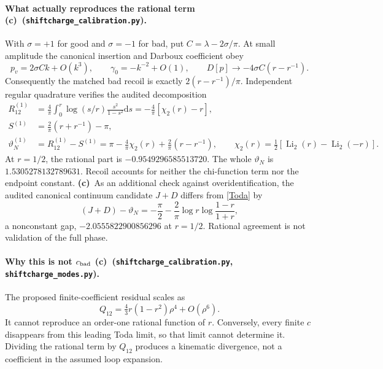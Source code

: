 \documentclass[11pt,a4paper]{article}
\newcommand{\C}{\textbf{(c)}\ }
\newcommand{\dd}{\mathrm d}
\newcommand{\file}[1]{\nolinkurl{#1}}
\newcommand{\modes}{\file{shiftcharge_modes.py}}
\newcommand{\calcheck}{\file{shiftcharge_calibration.py}}
\begin{document}
\paragraph{What actually reproduces the rational term \C (\calcheck).}
With $\sigma=+1$ for good and $\sigma=-1$ for bad, put
$C=\lambda-2\sigma/\pi$. At small amplitude the canonical insertion and
Darboux coefficient obey
\begin{equation}
 p_v=2\sigma Ck+O(k^3),\qquad \gamma_0=-k^{-2}+O(1),\qquad
 D[p]\longrightarrow-4\sigma C(r-r^{-1}).\label{Dlimit}
\end{equation}
Consequently the matched bad recoil is exactly $2(r-r^{-1})/\pi$.
Independent regular quadrature verifies the audited decomposition
\begin{align}
 R_{12}^{(1)}&=\frac4\pi\int_0^r\log(s/r)\frac{s^2}{1-s^2}\dd s
             =-\frac4\pi[\chi_2(r)-r],\\
 S^{(1)}&=\frac2\pi(r+r^{-1})-\pi,\\
 \vartheta_N^{(1)}&=R_{12}^{(1)}-S^{(1)}
       =\pi-\frac4\pi\chi_2(r)+\frac2\pi(r-r^{-1}),\qquad
 \chi_2(r)=\tfrac12[\operatorname{Li}_2(r)-\operatorname{Li}_2(-r)].
 \label{Toda}
\end{align}
At $r=1/2$, the rational part is $-0.9549296585513720$.
The whole $\vartheta_N$ is $1.5305278132789631$. Recoil accounts for neither
the chi-function term nor the endpoint constant.
\C As an additional check against overidentification, the audited canonical
continuum candidate $J+D$ differs from \eqref{Toda} by
\begin{equation}
 (J+D)-\vartheta_N=-\frac\pi2-\frac2\pi\log r\log\frac{1-r}{1+r},
\end{equation}
a nonconstant gap, $-2.0555822900856296$ at $r=1/2$. Rational agreement
is not validation of the full phase.

\paragraph{Why this is not $c_{\rm bad}$ \C (\calcheck, \modes).}
The proposed finite-coefficient residual scales as
\begin{equation}
 Q_{12}=\tfrac43r(1-r^2)\rho^4+O(\rho^6).
\end{equation}
It cannot reproduce an order-one rational function of $r$. Conversely,
every finite $c$ disappears from this leading Toda limit, so that limit
cannot determine it. Dividing the rational term by $Q_{12}$ produces a
kinematic divergence, not a coefficient in the assumed loop expansion.
\end{document}
